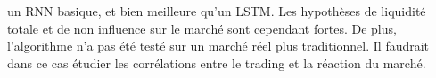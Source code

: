 \documentclass[a4paper]{article}
\begin{document}
un RNN basique, et bien meilleure qu'un LSTM. Les hypothèses de liquidité totale et de non influence sur le marché sont cependant fortes. De plus, l'algorithme n'a pas été testé sur un marché réel plus traditionnel. Il faudrait dans ce cas étudier les corrélations entre le trading et la réaction du marché.





\nocite{*}
\printbibliography
\end{document}
